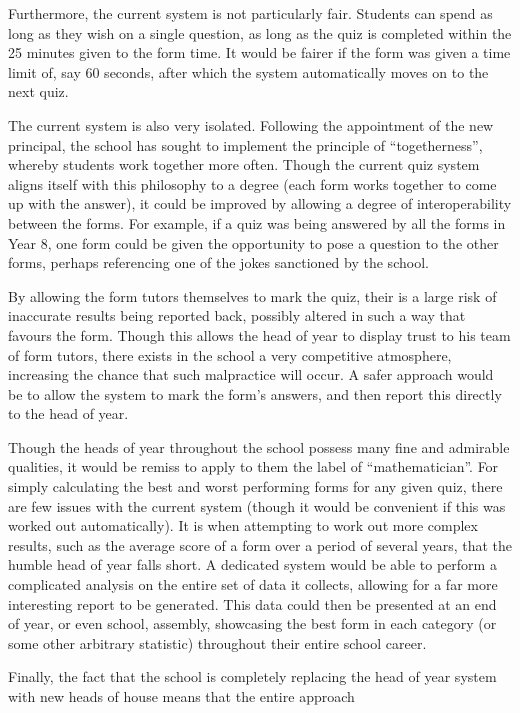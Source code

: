 Furthermore, the current system is not particularly fair. Students can spend as long as they wish on a single question, as long as the quiz is completed within the 25 minutes given to the form time. It would be fairer if the form was given a time limit of, say 60 seconds, after which the system automatically moves on to the next quiz.

The current system is also very isolated. Following the appointment of the new principal, the school has sought to implement the principle of ``togetherness'', whereby students work together more often. Though the current quiz system aligns itself with this philosophy to a degree (each form works together to come up with the answer), it could be improved by allowing a degree of interoperability between the forms. For example, if a quiz was being answered by all the forms in Year 8, one form could be given the opportunity to pose a question to the other forms, perhaps referencing one of the jokes sanctioned by the school.

By allowing the form tutors themselves to mark the quiz, their is a large risk of
inaccurate results being reported back, possibly altered in such a way that favours the form. Though this allows the head of year to display trust to his team of form tutors, there exists in the school a very competitive atmosphere, increasing the chance that such malpractice will occur. A safer approach would be to allow the system to mark the form's answers, and then report this directly to the head of year.

Though the heads of year throughout the school possess many fine and admirable qualities, it would be remiss to apply to them the label of ``mathematician''.  For simply calculating the best and worst performing forms for any given quiz, there are few issues with the current system (though it would be convenient if this was worked out automatically). It is when attempting to work out more complex results, such as the average score of a form over a period of several years, that the humble head of year falls short. A dedicated system would be able to perform a complicated analysis on the entire set of data it collects, allowing for a far more interesting report to be generated. This data could then be presented at an end of year, or even school, assembly, showcasing the best form in each category (or some other arbitrary statistic) throughout their entire school career.

Finally, the fact that the school is completely replacing the head of year system with new heads of house means that the entire approach